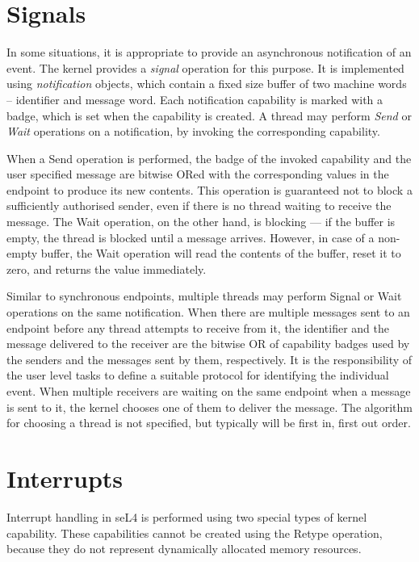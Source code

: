 \section{Signals}\label{sec:overview.signals}

In some situations, it is appropriate to provide an asynchronous notification
of an event. The kernel provides a \emph{signal} operation for this
purpose. It is implemented using \emph{notification} objects, which
contain a fixed size buffer of two machine words -- identifier and message word. 
Each notification capability is marked with a badge, which is set when
the capability is created. A thread may perform \emph{Send} or \emph{Wait}
operations on a notification, by invoking the corresponding
capability. 

When a Send operation is performed, the badge of the invoked capability and the
user specified message are bitwise ORed with the corresponding values in the
endpoint to produce its new contents. This operation is guaranteed not to block
a sufficiently authorised sender, even if there is no thread waiting to receive
the message. The Wait operation, on the other hand, is blocking --- if the
buffer is empty, the thread is blocked until a message arrives. However, in
case of a non-empty buffer, the Wait operation will read the contents of the
buffer, reset it to zero, and returns the value immediately. 

Similar to synchronous endpoints, multiple threads may perform Signal or Wait
operations on the same notification. When there are multiple messages
sent to an endpoint before any thread attempts to receive from it, the
identifier and the message delivered to the receiver are the bitwise OR of
capability badges used by the senders and the messages sent by them,
respectively. It is the responsibility of the user level tasks to define a
suitable protocol for identifying the individual event. When multiple receivers
are waiting on the same endpoint when a message is sent to it, the kernel
chooses one of them to deliver the message. The algorithm for choosing a thread
is not specified, but typically will be first in, first out order.

\section{Interrupts}\label{sec:overview.interrupts}

Interrupt handling in seL4 is performed using two special types of kernel 
capability. These capabilities cannot be created using the Retype operation,
because they do not represent dynamically allocated memory resources.

